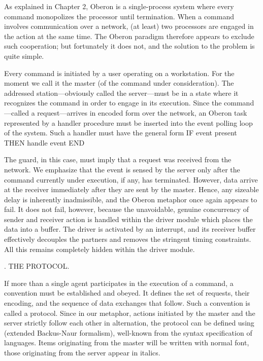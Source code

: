 As explained in Chapter 2, Oberon is a single-process system where every command monopolizes the processor until termination. When a command involves communication over a network, (at least) two processors are engaged in the action at the same time. The Oberon paradigm therefore appears to exclude such cooperation; but fortunately it does not, and the solution to the problem is quite simple.

Every command is initiated by a user operating on a workstation. For the moment we call it the master (of the command under consideration). The addressed station---obviously called the server---must be in a state where it recognizes the command in order to engage in its execution. Since the command---called a request---arrives in encoded form over the network, an Oberon task represented by a handler procedure must be inserted into the event polling loop of the system. Such a handler must have the general form
\begintt
IF event present THEN handle event END
\endtt

\noindent The guard, in this case, must imply that a request was received from the network. We emphasize that the event is sensed by the server only after the command currently under execution, if any, has terminated. However, data arrive at the receiver immediately after they are sent by the master. Hence, any sizeable delay is inherently inadmissible, and the Oberon metaphor once again appears to fail. It does not fail, however, because the unavoidable, genuine concurrency of sender and receiver action is handled within the driver module which places the data into a buffer. The driver is activated by an interrupt, and its receiver buffer effectively decouples the partners and removes the stringent timing constraints. All this remains completely hidden within the driver module.

. THE PROTOCOL.

If more than a single agent participates in the execution of a command, a convention must be established and obeyed. It defines the set of requests, their encoding, and the sequence of data exchanges that follow. Such a convention is called a protocol. Since in our metaphor, actions initiated by the master and the server strictly follow each other in alternation, the protocol can be defined using  (extended Backus-Naur formalism), well-known from the syntax specification of languages. Items originating from the master will be written with normal font, those originating from the server appear in italics.

